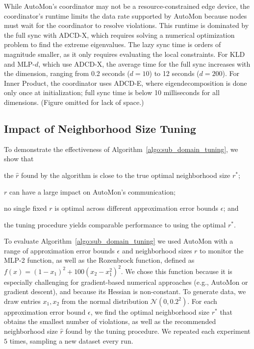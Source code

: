 While AutoMon's coordinator may not be a resource-constrained edge device, the coordinator's runtime limits the data rate supported by AutoMon because nodes must wait for the coordinator to resolve violations.
This runtime is dominated by the full sync with ADCD-X, which requires solving a numerical optimization problem to find the extreme eigenvalues.
The lazy sync time is orders of magnitude smaller, as it only requires evaluating the local constraints.
%
For KLD and MLP-$d$, which use ADCD-X, the average time for the full sync increases with the dimension, ranging from 0.2 seconds ($d=10$) to 12 seconds ($d=200$).
For Inner Product, the coordinator uses ADCD-E, where eigendecomposition is done only once at initialization; full sync time is below 10 milliseconds for all dimensions.
(Figure omitted for lack of space.)







\subsection{Impact of Neighborhood Size Tuning}
\label{sec:eval-sub-domain-size}

To demonstrate the effectiveness of Algorithm~\ref{algo:sub_domain_tuning},
we show that 
\begin{enumerate*}
\item the $\hat{r}$ found by the algorithm is close to the true optimal neighborhood size $r^*$;
\item $r$ can have a large impact on AutoMon's communication;
\item no single fixed $r$ is optimal across different approximation error bounds $\epsilon$; and
\item the tuning procedure yields comparable performance to using the optimal $r^*$.
\end{enumerate*}


To evaluate Algorithm~\ref{algo:sub_domain_tuning} we used AutoMon with a range of approximation error bounds $\epsilon$ and neighborhood sizes $r$ to monitor the MLP-2 function, as well as the Rozenbrock function, defined as $f(x) = (1 - x_1)^2 + 100 \left(x_2 - x_1^2\right)^2$.
We chose this function because it is especially challenging for gradient-based numerical approaches (e.g., AutoMon or gradient descent), and because its Hessian is non-constant. To generate data, we draw entries $x_1,x_2$ from the normal distribution $\mathcal{N}(0, 0.2^2)$.
%
For each approximation error bound $\epsilon$, we find the optimal neighborhood size $r^*$ that obtains the smallest number of violations, as well as the recommended neighborhood size $\hat{r}$ found by the tuning procedure.
We repeated each experiment $5$ times, sampling a new dataset every run.

